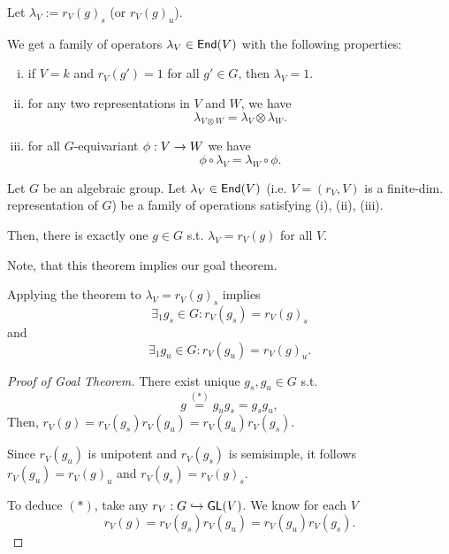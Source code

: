 Let $\lambda_V := r_V(g)_s$ (or $r_V(g)_u$).

We get a family of operators $\lambda_V \in \textsf{End}(V)$ with the following properties:
\begin{enumerate}[(i)]
	\item if $V = k$ and $r_V(g') = 1$ for all $g' \in G$, then $\lambda_V = 1$.
	\item for any two representations in $V$ and $W$, we have
	\[\lambda_{V\otimes W} = \lambda_V \otimes \lambda_W.\]
	\item for all $G$-equivariant $\phi : V \overset{}{\rightarrow} W$ we have
	\[ \phi \circ \lambda_V = \lambda_W \circ  \phi. \]
\end{enumerate}

\begin{theorem}
Let $G$ be an algebraic group. Let $\lambda_V \in \textsf{End}(V)$ (i.e. $V = (r_V, V)$ is a finite-dim. representation of $G$) be a family of operations satisfying (i), (ii), (iii).

Then, there is exactly one $g \in G$ s.t. $\lambda_V = r_V(g)$ for all $V$.
\end{theorem}
Note, that this theorem implies our goal theorem.

Applying the theorem to $\lambda_V = r_V(g)_s$ implies
\[ \exists_1 g_s \in G: r_V(g_s) = r_V(g)_s \]
and
\[ \exists_1 g_u \in G: r_V(g_u) = r_V(g)_u. \]

\begin{proof}[Proof of Goal Theorem]
There exist unique $g_s, g_u \in G$ s.t.
\[ g \overset{(*)}{=} g_u g_s = g_s g_u, \]
Then, $r_V(g) = r_V(g_s) r_V(g_u) = r_V(g_u) r_V(g_s)$.

Since $r_V(g_u)$ is unipotent and $r_V(g_s)$ is semisimple, it follows $r_V(g_u) = r_V(g)_u$ and $r_V(g_s) = r_V(g)_s$.

To deduce $(*)$, take any $r_V:G \overset{}{\hookrightarrow} \textsf{GL}(V)$. We know for each $V$
\[ r_V(g) = r_V(g_s) r_V(g_u) = r_V(g_u)r_V(g_s). \]
\end{proof}


